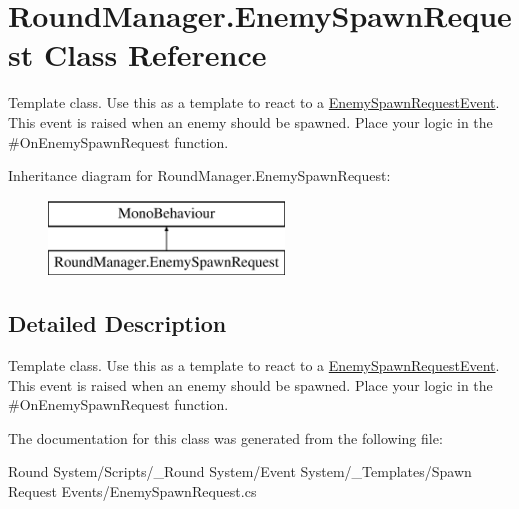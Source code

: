 \hypertarget{class_round_manager_1_1_enemy_spawn_request}{}\section{Round\+Manager.\+Enemy\+Spawn\+Request Class Reference}
\label{class_round_manager_1_1_enemy_spawn_request}


Template class. Use this as a template to react to a \hyperlink{class_round_manager_1_1_events_1_1_enemy_spawn_request_event}{Enemy\+Spawn\+Request\+Event}. This event is raised when an enemy should be spawned. Place your logic in the \#\+On\+Enemy\+Spawn\+Request function.  


Inheritance diagram for Round\+Manager.\+Enemy\+Spawn\+Request\+:\begin{figure}[H]
\begin{center}
\leavevmode
\includegraphics[height=2.000000cm]{class_round_manager_1_1_enemy_spawn_request}
\end{center}
\end{figure}


\subsection{Detailed Description}
Template class. Use this as a template to react to a \hyperlink{class_round_manager_1_1_events_1_1_enemy_spawn_request_event}{Enemy\+Spawn\+Request\+Event}. This event is raised when an enemy should be spawned. Place your logic in the \#\+On\+Enemy\+Spawn\+Request function. 



The documentation for this class was generated from the following file\+:\begin{DoxyCompactItemize}
\item 
Round System/\+Scripts/\+\_\+\+Round System/\+Event System/\+\_\+\+Templates/\+Spawn Request Events/Enemy\+Spawn\+Request.\+cs\end{DoxyCompactItemize}
